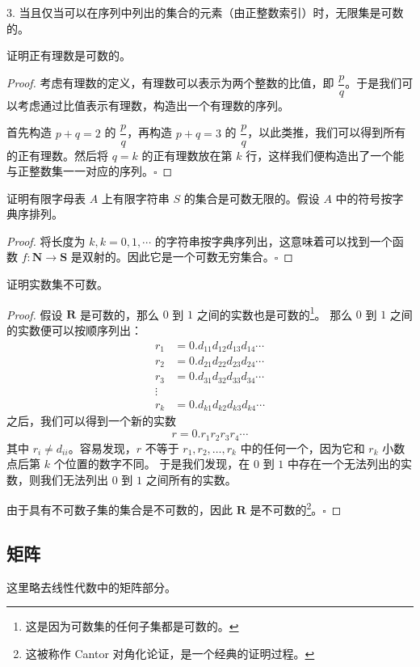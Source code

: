 \documentclass[normal,cyan]{elegantnote}
\newcommand{\QED}{\square}
\begin{document}
3. 当且仅当可以在序列中列出的集合的元素（由正整数索引）时，无限集是可数的。
\begin{example}
    证明正有理数是可数的。
\end{example}
\begin{proof}
    考虑有理数的定义，{\color{red}有理数可以表示为两个整数的比值}，即 $\dfrac pq$。于是我们可以考虑通过比值表示有理数，构造出一个有理数的序列。

    首先构造 $p + q = 2$ 的 $\dfrac pq$，再构造 $p + q = 3$ 的 $\dfrac pq$，以此类推，我们可以得到所有的正有理数。然后将 $q = k$ 的正有理数放在第 $k$ 行，这样我们便构造出了一个能与正整数集一一对应的序列。$\QED$
\end{proof}
\begin{example}
    证明有限字母表 $A$ 上有限字符串 $S$ 的集合是可数无限的。假设 $A$ 中的符号按字典序排列。
\end{example}
\begin{proof}
    将长度为 $k, k = 0 , 1, \cdots$ 的字符串按字典序列出，这意味着可以找到一个函数 $f: \mathbf{N} \to \mathbf{S}$ 是双射的。因此它是一个可数无穷集合。$\QED$
\end{proof}
\begin{example}
    证明实数集不可数。
\end{example}
\begin{proof}
    假设 $\mathbf{R}$ 是可数的，那么 $0$ 到 $1$ 之间的实数也是可数的\footnote{这是因为可数集的任何子集都是可数的。}。
    那么 $0$ 到 $1$ 之间的实数便可以按顺序列出：$$\begin{aligned}r_1 &= 0.d_{11}d_{12}d_{13}d_{14}\cdots \\
    r_2 &= 0.d_{21}d_{22}d_{23}d_{24}\cdots \\
    r_3 &= 0.d_{31}d_{32}d_{33}d_{34}\cdots \\
    \vdots \\
    r_k &= 0.d_{k1}d_{k2}d_{k3}d_{k4}\cdots\end{aligned}$$
    之后，我们可以得到一个新的实数 $$r = 0.r_1r_2r_3r_4\cdots$$ 其中 $r_i \neq d_{ii}$。容易发现，$r$ 不等于 $r_1, r_2, \dots, r_k$ 中的任何一个，因为它和 $r_k$ 小数点后第 $k$ 个位置的数字不同。
    于是我们发现，在 $0$ 到 $1$ 中存在一个无法列出的实数，则我们无法列出 $0$ 到 $1$ 之间所有的实数。

    由于具有不可数子集的集合是不可数的，因此 $\mathbf{R}$ 是不可数的\footnote{这被称作 Cantor 对角化论证，是一个经典的证明过程。}。$\QED$
\end{proof}
\subsection{矩阵}
这里略去线性代数中的矩阵部分。
\end{document}
